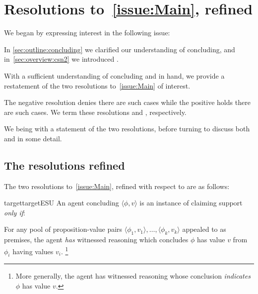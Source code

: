 \section{Resolutions to~\autoref{issue:Main}, refined}
\label{sec:issue-refined}

\begin{note}
  We began by expressing interest in the following issue:
  \vspace{-\baselineskip}
  \begin{quote}
    \issueMain*
  \end{quote}
  In \autoref{sec:outline:concluding} we clarified our understanding of concluding, and in~\autoref{sec:overview:csn2} we introduced .

  With a sufficient understanding of concluding and  in hand, we provide a restatement of the two resolutions to~\autoref{issue:Main} of interest.

  The negative resolution denies there are such cases while the positive holds there are such cases.
  We term these resolutions \ESU{} and \EAS{}, respectively.

  We being with a statement of the two resolutions, before turning to discuss both \ESU{} and \EAS{} in some detail.
\end{note}

\subsection{The resolutions refined}
\label{sec:two-resolutions}

\begin{note}
  The two resolutions to~\autoref{issue:Main}, refined with respect to  are as follows:
\end{note}

\begin{note}
  \begin{restatable}{target}{targetESU}
    \label{denied-claim}
    An agent concluding \(\langle \phi,v \rangle\) is an instance of claiming support \emph{only if}:

    For any pool of proposition-value pairs \(\langle \phi_{1},v_{1} \rangle,\dots,\langle \phi_{k},v_{k} \rangle\) appealed to as premises, the agent \emph{has} witnessed reasoning which concludes \(\phi\) has value \(v\) from \(\phi_{i}\) having values \(v_{i}\).\nolinebreak
    \footnote{More generally, the agent has witnessed reasoning whose conclusion \emph{indicates} \(\phi\) has value \(v\).}
  \end{restatable}
\end{note}

